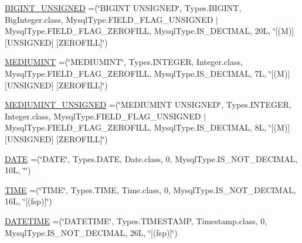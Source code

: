 \begin{DoxyCompactItemize}
\item 
\mbox{\hyperlink{enumcom_1_1mysql_1_1cj_1_1_mysql_type_a4cb24739cd3da8ce7e10b6cdb0e13765}{B\+I\+G\+I\+N\+T\+\_\+\+U\+N\+S\+I\+G\+N\+ED}} =(\char`\"{}B\+I\+G\+I\+NT U\+N\+S\+I\+G\+N\+ED\char`\"{}, Types.\+B\+I\+G\+I\+NT, Big\+Integer.\+class, Mysql\+Type.\+F\+I\+E\+L\+D\+\_\+\+F\+L\+A\+G\+\_\+\+U\+N\+S\+I\+G\+N\+ED $\vert$ Mysql\+Type.\+F\+I\+E\+L\+D\+\_\+\+F\+L\+A\+G\+\_\+\+Z\+E\+R\+O\+F\+I\+LL, Mysql\+Type.\+I\+S\+\_\+\+D\+E\+C\+I\+M\+AL, 20\+L, \char`\"{}\mbox{[}(\+M)\mbox{]} \mbox{[}\+U\+N\+S\+I\+G\+N\+E\+D\mbox{]} \mbox{[}\+Z\+E\+R\+O\+F\+I\+L\+L\mbox{]}\char`\"{})
\item 
\mbox{\hyperlink{enumcom_1_1mysql_1_1cj_1_1_mysql_type_ab95197c592f1fbd01abed94679b373ca}{M\+E\+D\+I\+U\+M\+I\+NT}} =(\char`\"{}M\+E\+D\+I\+U\+M\+I\+NT\char`\"{}, Types.\+I\+N\+T\+E\+G\+ER, Integer.\+class, Mysql\+Type.\+F\+I\+E\+L\+D\+\_\+\+F\+L\+A\+G\+\_\+\+Z\+E\+R\+O\+F\+I\+LL, Mysql\+Type.\+I\+S\+\_\+\+D\+E\+C\+I\+M\+AL, 7\+L, \char`\"{}\mbox{[}(\+M)\mbox{]} \mbox{[}\+U\+N\+S\+I\+G\+N\+E\+D\mbox{]} \mbox{[}\+Z\+E\+R\+O\+F\+I\+L\+L\mbox{]}\char`\"{})
\item 
\mbox{\hyperlink{enumcom_1_1mysql_1_1cj_1_1_mysql_type_a92af70931d9dd83d1457ba82ff3f46fc}{M\+E\+D\+I\+U\+M\+I\+N\+T\+\_\+\+U\+N\+S\+I\+G\+N\+ED}} =(\char`\"{}M\+E\+D\+I\+U\+M\+I\+NT U\+N\+S\+I\+G\+N\+ED\char`\"{}, Types.\+I\+N\+T\+E\+G\+ER, Integer.\+class, Mysql\+Type.\+F\+I\+E\+L\+D\+\_\+\+F\+L\+A\+G\+\_\+\+U\+N\+S\+I\+G\+N\+ED $\vert$ Mysql\+Type.\+F\+I\+E\+L\+D\+\_\+\+F\+L\+A\+G\+\_\+\+Z\+E\+R\+O\+F\+I\+LL, Mysql\+Type.\+I\+S\+\_\+\+D\+E\+C\+I\+M\+AL, 8\+L, \char`\"{}\mbox{[}(\+M)\mbox{]} \mbox{[}\+U\+N\+S\+I\+G\+N\+E\+D\mbox{]} \mbox{[}\+Z\+E\+R\+O\+F\+I\+L\+L\mbox{]}\char`\"{})
\item 
\mbox{\hyperlink{enumcom_1_1mysql_1_1cj_1_1_mysql_type_a27b01e95b5b669490e934d7484aa67eb}{D\+A\+TE}} =(\char`\"{}D\+A\+TE\char`\"{}, Types.\+D\+A\+TE, Date.\+class, 0, Mysql\+Type.\+I\+S\+\_\+\+N\+O\+T\+\_\+\+D\+E\+C\+I\+M\+AL, 10\+L, \char`\"{}\char`\"{})
\item 
\mbox{\hyperlink{enumcom_1_1mysql_1_1cj_1_1_mysql_type_a4f40234bb514d5564a25a6585bd8ab36}{T\+I\+ME}} =(\char`\"{}T\+I\+ME\char`\"{}, Types.\+T\+I\+ME, Time.\+class, 0, Mysql\+Type.\+I\+S\+\_\+\+N\+O\+T\+\_\+\+D\+E\+C\+I\+M\+AL, 16\+L, \char`\"{}\mbox{[}(fsp)\mbox{]}\char`\"{})
\item 
\mbox{\hyperlink{enumcom_1_1mysql_1_1cj_1_1_mysql_type_a10ab4319f5464017da0b6c5d8ba57840}{D\+A\+T\+E\+T\+I\+ME}} =(\char`\"{}D\+A\+T\+E\+T\+I\+ME\char`\"{}, Types.\+T\+I\+M\+E\+S\+T\+A\+MP, Timestamp.\+class, 0, Mysql\+Type.\+I\+S\+\_\+\+N\+O\+T\+\_\+\+D\+E\+C\+I\+M\+AL, 26\+L, \char`\"{}\mbox{[}(fsp)\mbox{]}\char`\"{})

\end{DoxyCompactItemize}
